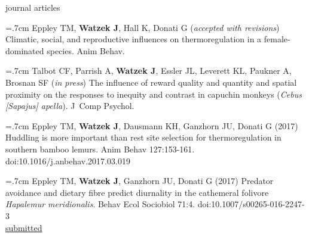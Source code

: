 \documentclass[]{friggeri-cv}
\begin{document}




{\subfont\large{} journal articles}

\hangindent=.7cm Eppley TM, \textbf{Watzek J}, Hall K, Donati G (\emph{accepted with revisions}) Climatic, social, and reproductive influences on thermoregulation in a female-dominated species. Anim Behav.

\hangindent=.7cm Talbot CF, Parrish A, \textbf{Watzek J}, Essler JL, Leverett KL, Paukner A, Brosnan SF (\emph{in press}) The influence of reward quality and quantity and spatial proximity on the responses to inequity and contrast in capuchin monkeys (\emph{Cebus [Sapajus] apella}). J~Comp Psychol.

\hangindent=.7cm Eppley TM, \textbf{Watzek J}, Dausmann KH, Ganzhorn JU, Donati G (2017) Huddling is more important than rest site selection for thermoregulation in southern bamboo lemurs. Anim Behav 127:153-161. doi:10.1016/j.anbehav.2017.03.019

\hangindent=.7cm Eppley TM, \textbf{Watzek J}, Ganzhorn JU, Donati G (2017) Predator avoidance and dietary fibre predict diurnality in the cathemeral folivore \emph{Hapalemur meridionalis}. Behav Ecol Sociobiol 71:4. doi:10.1007/s00265-016-2247-3 \\[.5cm]


\hspace{.35cm} { \underline{submitted}}
\end{document}
